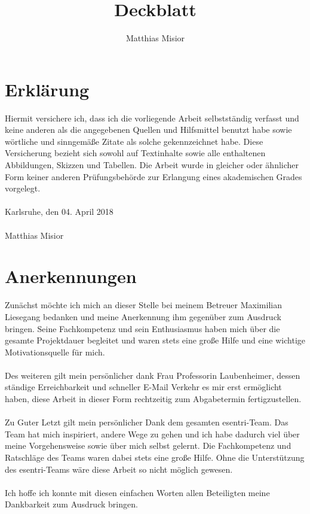 \documentclass[a4paper,12pt,twoside]{scrartcl}
\title{Deckblatt}
\author{Matthias Misior}
\begin{document}
\thispagestyle{empty}
\section*{Erklärung}
Hiermit versichere ich, dass ich die vorliegende Arbeit selbstständig verfasst und keine anderen als die angegebenen Quellen und Hilfsmittel benutzt habe sowie wörtliche und sinngemäße Zitate als solche gekennzeichnet habe. Diese Versicherung bezieht sich sowohl auf
Textinhalte sowie alle enthaltenen Abbildungen, Skizzen und Tabellen. Die Arbeit wurde in gleicher oder ähnlicher Form keiner anderen Prüfungsbehörde zur Erlangung eines akademischen Grades vorgelegt.
\\\\
Karlsruhe, den 04. April 2018
\\\\
Matthias Misior \noindent\dotfill

\newpage
\thispagestyle{empty}
\section*{Anerkennungen}
Zunächst möchte ich mich an dieser Stelle bei meinem Betreuer Maximilian Liesegang bedanken und meine Anerkennung ihm gegenüber zum Ausdruck bringen. Seine Fachkompetenz und sein Enthusiasmus haben mich über die gesamte Projektdauer begleitet und waren stets eine große Hilfe und eine wichtige Motivationsquelle für mich. 
\\\\
Des weiteren gilt mein persönlicher dank Frau Professorin Laubenheimer, dessen ständige Erreichbarkeit und schneller E-Mail Verkehr es mir erst ermöglicht haben, diese Arbeit in dieser Form rechtzeitig zum Abgabetermin fertigzustellen. 
\\\\
Zu Guter Letzt gilt mein persönlicher Dank dem gesamten esentri-Team. Das Team hat mich inspiriert, andere Wege zu gehen und ich habe dadurch viel über meine Vorgehensweise sowie über mich selbst gelernt. Die Fachkompetenz und Ratschläge des Teams waren dabei stets eine große Hilfe. Ohne die Unterstützung des esentri-Teams wäre diese Arbeit so nicht möglich gewesen.
\\\\
Ich hoffe ich konnte mit diesen einfachen Worten allen Beteiligten meine Dankbarkeit zum Ausdruck bringen. 

\newpage
\thispagestyle{empty}
\end{document}
